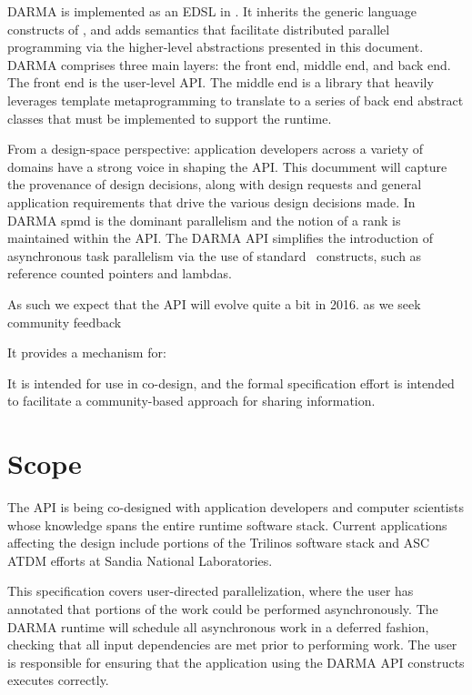DARMA is implemented as an \gls{EDSL} in \CC.
It inherits the generic language constructs of \CC, and adds 
\gls{semantics} that facilitate distributed parallel programming via the
higher-level abstractions presented in this document. 
DARMA comprises three main layers: the \gls{front end}, \gls{middle end}, and
\gls{back end}.  The \gls{front end} is the user-level \gls{API}.  The
\gls{middle end} is a library that heavily leverages \CC \gls{template metaprogramming} 
to translate to a series of \gls{back end} abstract classes that must be
implemented to support the runtime.



From a design-space perspective: application developers across a variety of domains have a strong voice in
shaping the \gls{API}.  This documment will capture the provenance of design
decisions, along with design requests and general application requirements that
drive the various design decisions made.
In DARMA \gls{spmd} is the dominant parallelism and the notion of a \gls{rank}
is maintained within the \gls{API}.   
  The DARMA \gls{API} simplifies the introduction
  of asynchronous task parallelism via the use of standard \CC\ constructs, such
  as \gls{reference counted pointers} and \glspl{lambda}.

As such we expect that the \gls{API} will evolve quite a bit in 2016.  as we seek
community feedback

It provides a mechanism for:



It is intended for use in co-design, and the formal
specification effort is intended to facilitate a community-based approach for
sharing information.











\section{Scope}
\label{sec:scope}
The \gls{API} is being \gls{co-design}ed with application developers
and computer scientists whose knowledge spans the entire runtime software stack.
Current applications affecting the design include portions of the \gls{Trilinos} software stack
and \gls{ASC} \gls{ATDM} efforts at Sandia National Laboratories. 
 


This specification covers user-directed parallelization, where the user
has annotated that portions of the work could be performed asynchronously.
The DARMA runtime will schedule all asynchronous work in a \gls{deferred} fashion,
checking that all \gls{input dependencies} are met prior to performing work.  
The user is responsible for ensuring that the application using the DARMA
\gls{API} constructs executes correctly.



